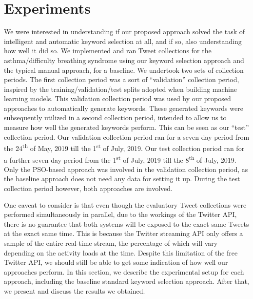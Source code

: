 \documentclass[runningheads]{llncs}
\begin{document}
\section{Experiments}
We were interested in understanding if our proposed approach solved the task of intelligent and automatic keyword selection at all, and if so, also understanding how well it did so. We implemented and ran Tweet collections for the asthma/difficulty breathing syndrome using our keyword selection approach and the typical manual approach, for a baseline. We undertook two sets of collection periods. The first collection period was a sort of ``validation'' collection period, inspired by the training/validation/test splits adopted when building machine learning models. This validation collection period was used by our proposed approaches to automatically generate keywords. These generated keywords were subsequently utilized in a second collection period, intended to allow us to measure how well the generated keywords perform. This can be seen as our ``test'' collection period. Our validation collection period ran for a seven day period from the  24\textsuperscript{th} of May, 2019 till the 1\textsuperscript{st} of July, 2019. Our test collection period ran for a further seven day period from the 1\textsuperscript{st} of July, 2019 till the 8\textsuperscript{th} of July, 2019. Only the PSO-based approach was involved in the validation collection period, as the baseline approach does not need any data for setting it up. During the test collection period however, both approaches are involved.

One caveat to consider is that even though the evaluatory Tweet collections were performed simultaneously in parallel, due to the workings of the Twitter API, there is no guarantee that both systems will be exposed to the exact same Tweets at the exact same time. This is because the Twitter streaming API only offers a sample of the entire real-time stream, the percentage of which will vary depending on the activity loads at the time. Despite this limitation of the free Twitter API, we should still be able to get some indication of how well our approaches perform. In this section, we describe the experimental setup for each approach, including the baseline standard keyword selection approach. After that, we present and discuss the results we obtained.
\end{document}
